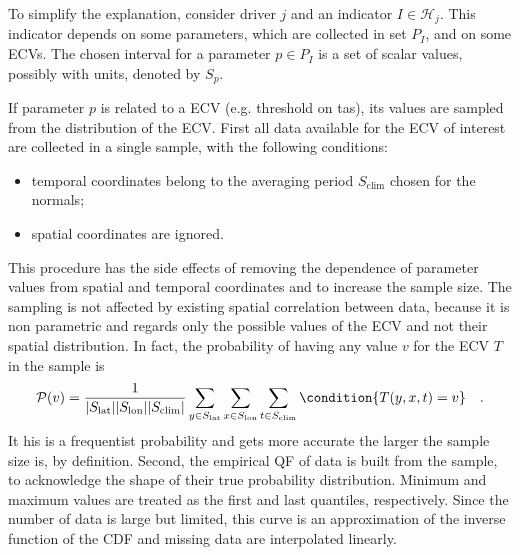To simplify the explanation, consider \gls{driver} $j$ and an \gls{indicator} $I \in \mathcal{H}_j$. This \gls{indicator} depends on some parameters, which are collected in set $P_I$, and on some \glspl{ECV}. The chosen interval for a parameter $p \in P_I$ is a set of scalar values, possibly with units, denoted by $S_p$.

If parameter $p$ is related to a \gls{ECV} (e.g. threshold on \gls{tas}), its values are sampled from the distribution of the \gls{ECV}. First all data available for the \gls{ECV} of interest are collected in a single sample, with the following conditions:
\begin{itemize}
  \item temporal coordinates belong to the averaging period $S_\text{clim}$ chosen for the \glspl{normal};
  \item spatial coordinates are ignored.
\end{itemize}
This procedure has the side effects of removing the dependence of parameter values from spatial and temporal coordinates and to increase the sample size. The sampling is not affected by existing spatial correlation between data, because it is non parametric and regards only the possible values of the \gls{ECV} and not their spatial distribution. In fact, the probability of having any value $v$ for the \gls{ECV} $T$ in the sample is
\begin{equation}
  \label{eq:variable_probability}
  \mathcal{P}(v) = \frac{1}{\abs{S_\text{lat}} \abs{S_\text{lon}} \abs{S_\text{clim}}} \sum_{y \in S_\text{lat}} \sum_{x \in S_\text{lon}} \sum_{t \in S_\text{clim}} \condition{T(y, x, t) = v}
  \quad .
\end{equation}
It his is a frequentist probability and gets more accurate the larger the sample size is, by definition. %
Second, the empirical \gls{QF} of data is built from the sample, to acknowledge the shape of their true probability distribution. Minimum and maximum values are treated as the first and last quantiles, respectively. Since the number of data is large but limited, this curve is an approximation of the inverse function of the \gls{CDF} and missing data are interpolated linearly.
